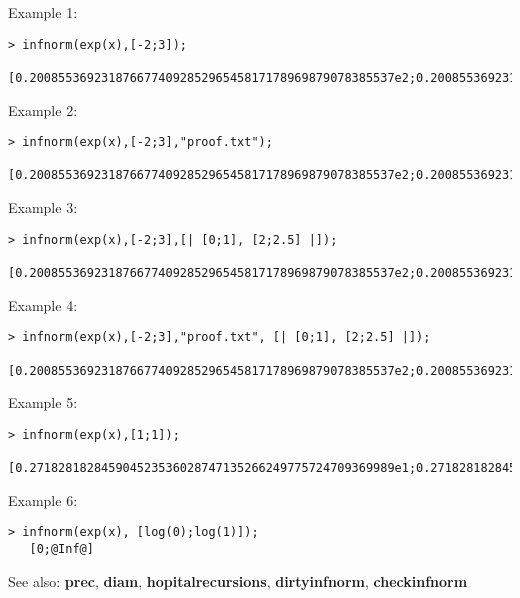 \noindent Example 1: 
\begin{center}\begin{minipage}{14.8cm}\begin{Verbatim}[frame=single]
   > infnorm(exp(x),[-2;3]);
   [0.200855369231876677409285296545817178969879078385537e2;0.200855369231876677409285296545817178969879078385544e2]
\end{Verbatim}
\end{minipage}\end{center}
\noindent Example 2: 
\begin{center}\begin{minipage}{14.8cm}\begin{Verbatim}[frame=single]
   > infnorm(exp(x),[-2;3],"proof.txt");
   [0.200855369231876677409285296545817178969879078385537e2;0.200855369231876677409285296545817178969879078385544e2]
\end{Verbatim}
\end{minipage}\end{center}
\noindent Example 3: 
\begin{center}\begin{minipage}{14.8cm}\begin{Verbatim}[frame=single]
   > infnorm(exp(x),[-2;3],[| [0;1], [2;2.5] |]);
   [0.200855369231876677409285296545817178969879078385537e2;0.200855369231876677409285296545817178969879078385544e2]
\end{Verbatim}
\end{minipage}\end{center}
\noindent Example 4: 
\begin{center}\begin{minipage}{14.8cm}\begin{Verbatim}[frame=single]
   > infnorm(exp(x),[-2;3],"proof.txt", [| [0;1], [2;2.5] |]);
   [0.200855369231876677409285296545817178969879078385537e2;0.200855369231876677409285296545817178969879078385544e2]
\end{Verbatim}
\end{minipage}\end{center}
\noindent Example 5: 
\begin{center}\begin{minipage}{14.8cm}\begin{Verbatim}[frame=single]
   > infnorm(exp(x),[1;1]);
   [0.271828182845904523536028747135266249775724709369989e1;0.271828182845904523536028747135266249775724709369998e1]
\end{Verbatim}
\end{minipage}\end{center}
\noindent Example 6: 
\begin{center}\begin{minipage}{14.8cm}\begin{Verbatim}[frame=single]
   > infnorm(exp(x), [log(0);log(1)]);
   [0;@Inf@]
\end{Verbatim}
\end{minipage}\end{center}
See also: \textbf{prec}, \textbf{diam}, \textbf{hopitalrecursions}, \textbf{dirtyinfnorm}, \textbf{checkinfnorm}
